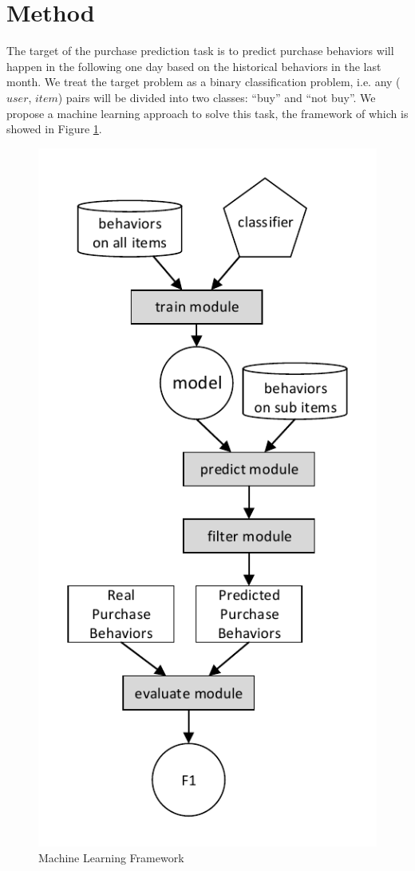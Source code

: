 \documentclass{llncs}
\begin{document}
\section{Method}
The target of the purchase prediction task is to predict purchase behaviors will happen
in the following one day based on the historical behaviors in the last month.
We treat the target problem as a binary classification problem,
i.e. any ($user$, $item$) pairs will be divided into two classes:
``buy'' and ``not buy''.
We propose a machine learning approach to solve this task,
the framework of which is showed in Figure \ref{fig:framework}.

\begin{figure}[htbp]
	\centering
	\includegraphics[scale=0.6]{images/system.pdf}
	\caption{Machine Learning Framework}
	\label{fig:framework}
\end{figure}
\end{document}
